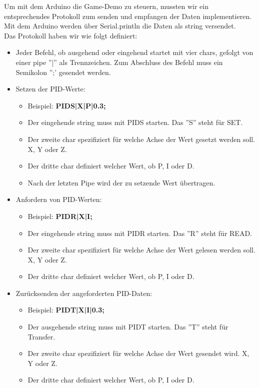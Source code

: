 Um mit dem Arduino die Game-Demo zu steuern, mussten wir ein entsprechendes Protokoll zum senden und empfangen der Daten implementieren. Mit dem Arduino werden über Serial.println die Daten als string versendet.\\

Das Protokoll haben wir wie folgt definiert:

\begin{itemize}
  \item Jeder Befehl, ob ausgehend oder eingehend startet mit vier chars, gefolgt von einer pipe ''|'' als Trennzeichen. Zum Abschluss des Befehl muss ein Semikolon '';' gesendet werden.
  \item Setzen der PID-Werte:
  \begin{itemize}
    \item Beispiel: \textbf{PIDS|X|P|0.3;}
    \item Der eingehende string muss mit PIDS starten. Das ''S'' steht für SET.
    \item Der zweite char spezifiziert für welche Achse der Wert gesetzt werden soll. X, Y oder Z.
    \item Der dritte char definiert welcher Wert, ob P, I oder D.
    \item Nach der letzten Pipe wird der zu setzende Wert übertragen.
  \end{itemize}
  \item  Anfordern von PID-Werten:
  \begin{itemize}
    \item Beispiel: \textbf{PIDR|X|I;}
    \item Der eingehende string muss mit PIDR starten. Das ''R'' steht für READ.
    \item Der zweite char spezifiziert für welche Achse der Wert gelesen werden soll. X, Y oder Z.
    \item Der dritte char definiert welcher Wert, ob P, I oder D.
  \end{itemize}
  \item  Zurücksenden der angeforderten PID-Daten:
  \begin{itemize}
    \item Beispiel: \textbf{PIDT|X|I|0.3;}
    \item Der ausgehende string muss mit PIDT starten. Das ''T'' steht für Transfer.
    \item Der zweite char spezifiziert für welche Achse der Wert gesendet wird. X, Y oder Z.
    \item Der dritte char definiert welcher Wert, ob P, I oder D.

\end{itemize}
\end{itemize}
